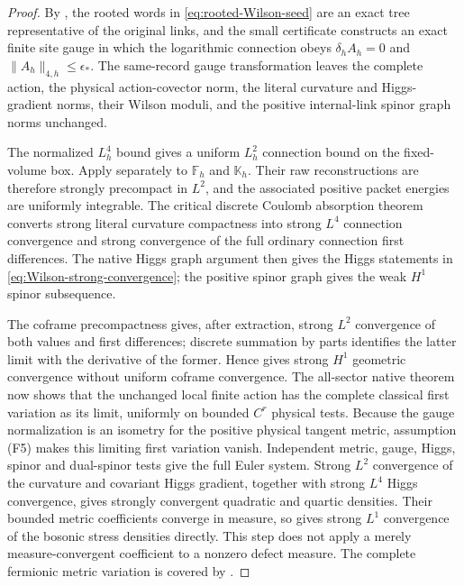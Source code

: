 \documentclass[11pt]{article}
\numberwithin{equation}{section}
\theoremstyle{definition}
\theoremstyle{remark}
\newcommand{\norm}[1]{\lVert#1\rVert}
\begin{document}
\begin{proof}
By , the rooted words in
\eqref{eq:rooted-Wilson-seed} are an exact tree representative of the
original links, and the small certificate constructs an exact finite site
gauge in which the logarithmic connection obeys
$\delta_hA_h=0$ and $\norm{A_h}_{4,h}\le\epsilon_*$.  The same-record gauge
transformation leaves the complete action, the physical action-covector
norm, the literal curvature and Higgs-gradient norms, their Wilson moduli,
and the positive internal-link spinor graph norms unchanged.

The normalized $L_h^4$ bound gives a uniform $L_h^2$ connection bound on
the fixed-volume box.  Apply  separately
to $\mathbb F_h$ and $\mathbb K_h$.  Their raw reconstructions are therefore
strongly precompact in $L^2$, and the associated positive packet energies are
uniformly integrable.  The critical discrete Coulomb absorption theorem
 converts strong literal curvature
compactness into strong $L^4$ connection convergence and strong convergence
of the full ordinary connection first differences.  The native Higgs graph
argument  then gives the Higgs statements
in \eqref{eq:Wilson-strong-convergence}; the positive spinor graph gives the
weak $H^1$ spinor subsequence.

The coframe precompactness gives, after extraction, strong $L^2$ convergence
of both values and first differences; discrete summation by parts identifies
the latter limit with the derivative of the former.  Hence
 gives strong $H^1$ geometric convergence
without uniform coframe convergence.  The all-sector native theorem  now shows
that the unchanged local finite action has the complete classical first
variation as its limit, uniformly on bounded $C^r$ physical tests.  Because
the gauge normalization is an isometry for the positive physical tangent
metric, assumption \textup{(F5)} makes this limiting first variation vanish.
Independent metric, gauge, Higgs, spinor and dual-spinor tests give the full
Euler system.  Strong $L^2$ convergence of the curvature and covariant Higgs
gradient, together with strong $L^4$ Higgs convergence, gives strongly
convergent quadratic and quartic densities.  Their bounded metric
coefficients converge in measure, so  gives strong
$L^1$ convergence of the bosonic stress densities directly.  This step does
not apply a merely measure-convergent coefficient to a nonzero defect
measure.  The complete fermionic metric variation is covered by
.
\end{proof}
\end{document}
